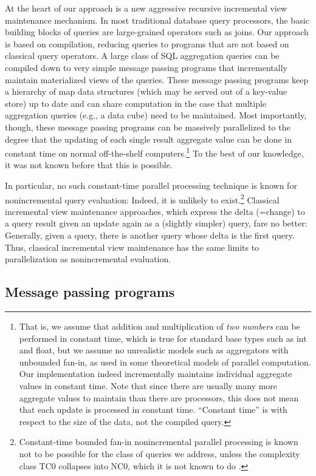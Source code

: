 At the heart of our approach is a new aggressive recursive incremental
view maintenance mechanism.
In most traditional database query processors, the  basic building blocks of
queries are large-grained operators such as joins.
Our approach is based on compilation, reducing
queries to programs that are not based on classical query operators.
A large class of
SQL aggregation queries can be compiled down to very simple message
passing programs that incrementally maintain materialized views of
the queries. These message passing programs keep a hierarchy of map data
structures (which may be served out of a key-value store) up to date
and can share computation in the case that multiple aggregation queries (e.g.,
a data cube) need to be maintained.  Most importantly, though, these message
passing programs can be massively parallelized to the degree that the updating
of each single result aggregate value can be done in constant time on normal
off-the-shelf computers.\footnote{That is,
we assume that addition and multiplication
of {\em two numbers} can be performed in constant time, which is true for
%
%
standard base types such as int and float,
but we assume no unrealistic models such
as aggregators with unbounded fan-in, as used in some theoretical models of
parallel computation. Our implementation indeed incrementally maintains
individual aggregate values in constant time. Note that since there are
usually many more aggregate values to maintain than there are processors,
this does not mean that each update is processed in constant time.
``Constant time'' is with respect to the size of the data, not the compiled
query.}
To the best of our knowledge, it was not known before
that this is possible.

In particular, no such constant-time parallel processing technique
is known for nonincremental query
evaluation: Indeed, it is unlikely to exist.\footnote{Constant-time
bounded fan-in nonincremental
parallel processing is known not to be possible for
the class of queries we address,
unless the complexity class TC0 collapses into NC0, which it is not known
to do \cite{Joh90}.} Classical incremental view maintenance approaches, which
express the delta (=change) to a query result given an update again
as a (slightly simpler) query, fare no better: Generally,
given a query, there is another query whose delta is the first query.
Thus, classical incremental view maintenance has the same limits to
parallelization as nonincremental evaluation.


\subsection{Message passing programs}


